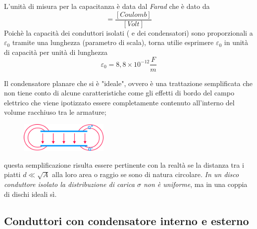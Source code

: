 L'unit\`a di misura per la capacitanza \`e data dal \textit{Farad} che \`e dato da 
\begin{equation*}
	[F] = \frac{[Coulomb]}{[Volt]}
\end{equation*}
Poich\`e la capacit\`a dei conduttori isolati ( e dei condensatori) sono proporzionali a $\varepsilon_0$ tramite una lunghezza (parametro di scala), torna utilie esprimere $\varepsilon_0$ in unit\`a di capacit\`a per unit\`a di lunghezza
\begin{equation*}
	\varepsilon_0 = 8,8 \times 10^{-12} \frac{F}{m}
\end{equation*}


Il condensatore planare che si \`e "ideale", ovvero \`e una trattazione semplificata che non tiene conto di alcune caratteristiche come gli effetti di bordo del campo elettrico che viene ipotizzato essere completamente contenuto all'interno del volume racchiuso tra le armature; 
\begin{figure}
  \centering
  \includegraphics[width=0.38\textwidth]{images/edge_effect}
\end{figure}
questa semplificazione risulta essere pertinente con la realt\`a se la distanza tra i piatti $d \ll \sqrt{A}$ alla loro area o raggio se sono di natura circolare. 
\textit{In un disco conduttore isolato la distribuzione di carica $\sigma$ non \`e uniforme}, ma in una coppia di dischi ideali s\`i.
\newpage

\subsection{Conduttori con condensatore interno e esterno}

